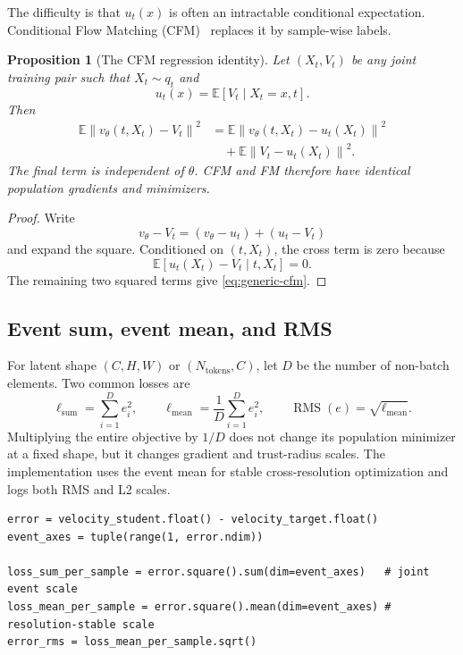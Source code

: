 \documentclass[11pt,a4paper]{article}
\newcommand{\E}{\mathbb{E}}
\newcommand{\norm}[1]{\left\lVert #1 \right\rVert}
\newcommand{\vtheta}{v_\theta}
\theoremstyle{plain}
\newtheorem{proposition}[theorem]{Proposition}
\theoremstyle{definition}
\begin{document}
The difficulty is that $u_t(x)$ is often an intractable conditional expectation.  Conditional
Flow Matching (CFM)~\cite{flowmatching} replaces it by sample-wise labels.

\begin{proposition}[The CFM regression identity]
\label{prop:generic-cfm}
Let $(X_t,V_t)$ be any joint training pair such that $X_t\sim q_t$ and
\begin{equation}
u_t(x)=\E[V_t\mid X_t=x,t].
\label{eq:conditional-velocity}
\end{equation}
Then
\begin{align}
\E\norm{\vtheta(t,X_t)-V_t}^2
&=
\E\norm{\vtheta(t,X_t)-u_t(X_t)}^2
\nonumber\\
&\quad+
\E\norm{V_t-u_t(X_t)}^2.
\label{eq:generic-cfm}
\end{align}
The final term is independent of $\theta$.  CFM and FM therefore have identical population
gradients and minimizers.
\end{proposition}

\begin{proof}
Write
\[
\vtheta-V_t=(\vtheta-u_t)+(u_t-V_t)
\]
and expand the square.  Conditioned on $(t,X_t)$, the cross term is zero because
\[
\E[u_t(X_t)-V_t\mid t,X_t]=0.
\]
The remaining two squared terms give \eqref{eq:generic-cfm}.
\end{proof}

\subsection{Event sum, event mean, and RMS}

For latent shape $(C,H,W)$ or $(N_{\mathrm{tokens}},C)$, let $D$ be the number of non-batch
elements.  Two common losses are
\begin{equation}
\ell_{\mathrm{sum}}=\sum_{i=1}^D e_i^2,
\qquad
\ell_{\mathrm{mean}}=\frac1D\sum_{i=1}^D e_i^2,
\qquad
\operatorname{RMS}(e)=\sqrt{\ell_{\mathrm{mean}}}.
\label{eq:sum-mean-rms}
\end{equation}
Multiplying the entire objective by $1/D$ does not change its population minimizer at a fixed
shape, but it changes gradient and trust-radius scales.  The implementation uses
the event mean for stable cross-resolution optimization and logs both RMS and L2 scales.

\begin{lstlisting}[style=python,caption={Equivalent target, different optimization scale.}]
error = velocity_student.float() - velocity_target.float()
event_axes = tuple(range(1, error.ndim))

loss_sum_per_sample = error.square().sum(dim=event_axes)   # joint event scale
loss_mean_per_sample = error.square().mean(dim=event_axes) # resolution-stable scale
error_rms = loss_mean_per_sample.sqrt()
\end{lstlisting}
\end{document}
